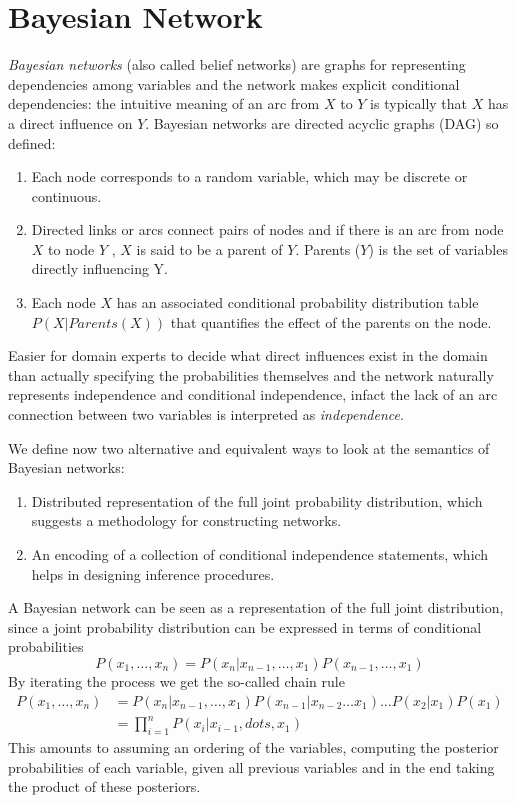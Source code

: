 \section{Bayesian Network}
\emph{Bayesian networks} (also called belief networks) are graphs for representing
dependencies among variables and the network makes explicit conditional dependencies:
the intuitive meaning of an arc from $X$ to $Y$ is typically that
$X$ has a direct influence on $Y$.\newline
Bayesian networks are directed acyclic graphs (DAG) so defined:
\begin{enumerate}
   \item Each node corresponds to a random variable, which may be discrete or continuous.
   \item Directed links or arcs connect pairs of nodes and if there is an arc from node $X$
	 to node $Y$ , $X$ is said to be a parent of $Y$.\newline
	 Parents ($Y$) is the set of variables directly influencing Y.
   \item Each node $X$ has an associated conditional probability distribution table
	 $P(X | Parents(X))$ that quantifies the effect of the parents on the node.
\end{enumerate}
Easier for domain experts to decide what direct influences exist in the domain than
actually specifying the probabilities themselves and the network naturally represents
independence and conditional independence, infact the lack of an arc connection between 
two variables is interpreted as \emph{independence}.

We define now two alternative and equivalent ways to look at
the semantics of Bayesian networks:
\begin{enumerate}
   \item Distributed representation of the full joint probability distribution, which
	 suggests a methodology for constructing networks.
   \item An encoding of a collection of conditional independence statements, which
	 helps in designing inference procedures.
\end{enumerate}
A Bayesian network can be seen as a representation of the full joint distribution, since
a joint probability distribution can be expressed in terms of conditional probabilities
\[ P(x_1, \dots, x_n) = P(x_n | x_{n-1}, \dots, x_1) P(x_{n-1}, \dots, x_1) \]
By iterating the process we get the so-called chain rule
\begin{align*}
	P(x_1, \dots, x_n) & = P(x_n | x_{n-1}, \dots, x_1) P(x_{n-1} | x_{n-2} \dots x_1)
	                      \dots P(x_2 | x_1) P(x_1) \\
			   & = \prod _{i=1}^n P(x_i | x_{i-1}, dots, x_1)
\end{align*}
This amounts to assuming an ordering of the variables, computing the posterior probabilities
of each variable, given all previous variables and in the end 
taking the product of these posteriors.


